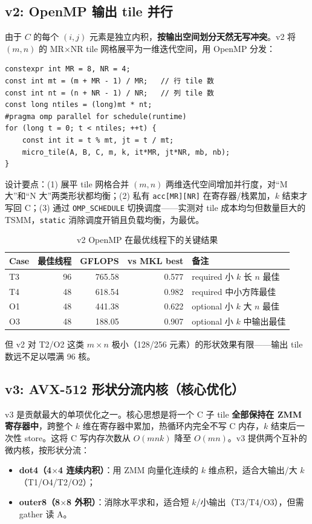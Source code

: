 \documentclass[11pt,a4paper,fontset=fandol]{ctexart}
\begin{document}
\subsection{v2: OpenMP 输出 tile 并行}
由于 $C$ 的每个 $(i,j)$ 元素是独立内积，\textbf{按输出空间划分天然无写冲突}。v2 将 $(m,n)$ 的 MR$\times$NR tile 网格展平为一维迭代空间，用 OpenMP 分发：
\begin{lstlisting}
constexpr int MR = 8, NR = 4;
const int mt = (m + MR - 1) / MR;   // 行 tile 数
const int nt = (n + NR - 1) / NR;   // 列 tile 数
const long ntiles = (long)mt * nt;
#pragma omp parallel for schedule(runtime)
for (long t = 0; t < ntiles; ++t) {
    const int it = t % mt, jt = t / mt;
    micro_tile(A, B, C, m, k, it*MR, jt*NR, mb, nb);
}
\end{lstlisting}
设计要点：(1) 展平 tile 网格合并 $(m,n)$ 两维迭代空间增加并行度，对“M 大”和“N 大”两类形状都均衡；(2) 私有 \texttt{acc[MR][NR]} 在寄存器/栈累加，$k$ 结束才写回 C；(3) 通过 \texttt{OMP\_SCHEDULE} 切换调度——实测对 tile 成本均匀但数量巨大的 TSMM，\texttt{static} 消除调度开销且负载均衡，为最优。

\begin{table}[H]
\centering
\caption{v2 OpenMP 在最优线程下的关键结果}
\small
\begin{tabular}{lrrrl}
\toprule
Case & 最佳线程 & GFLOPS & vs MKL best & 备注 \\
\midrule
T3 & 96 & 765.58 & 0.577 & required 小 $k$ 长 $n$ 最佳 \\
T4 & 48 & 618.54 & 0.982 & required 中小方阵最佳 \\
O1 & 48 & 441.38 & 0.622 & optional 小 $k$ 大 $n$ 最佳 \\
O3 & 48 & 188.05 & 0.907 & optional 小 $k$ 中输出最佳 \\
\bottomrule
\end{tabular}
\end{table}
但 v2 对 T2/O2 这类 $m\times n$ 极小（128/256 元素）的形状效果有限——输出 tile 数远不足以喂满 96 核。

\subsection{v3: AVX-512 形状分流内核（核心优化）}
v3 是贡献最大的单项优化之一。核心思想是将一个 C 子 tile \textbf{全部保持在 ZMM 寄存器中}，跨整个 $k$ 维在寄存器中累加，热循环内完全不写 C 内存，$k$ 结束后一次性 store。这将 C 写内存次数从 $O(mnk)$ 降至 $O(mn)$。v3 提供两个互补的微内核，按形状分流：
\begin{itemize}[leftmargin=2.4em]
  \item \textbf{dot4（4$\times$4 连续内积）}：用 ZMM 向量化连续的 $k$ 维点积，适合大输出/大 $k$（T1/O4/T2/O2）；
  \item \textbf{outer8（8$\times$8 外积）}：消除水平求和，适合短 $k$/小输出（T3/T4/O3），但需 gather 读 A。
\end{itemize}
\end{document}
